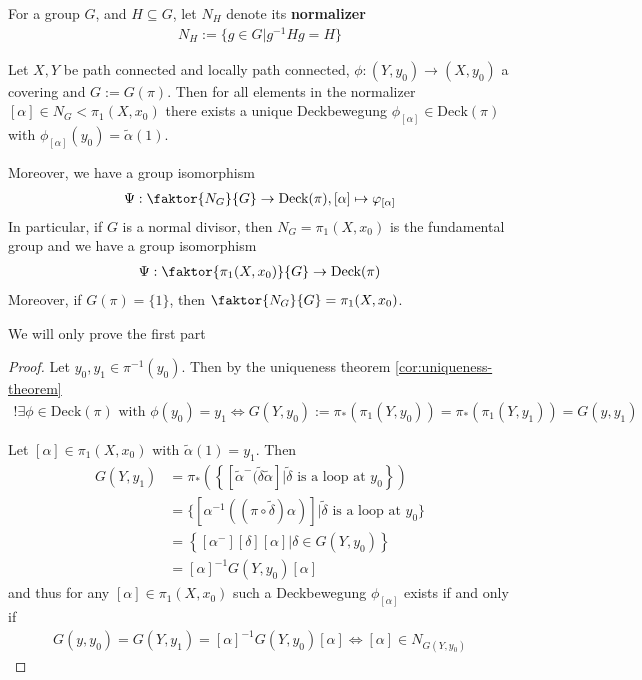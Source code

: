 For a group $G$, and $H \subseteq G$, let $N_H$ denote its \textbf{normalizer}
\begin{align*}
  N_H := \{g \in G \big\vert g^{-1}Hg = H\}
\end{align*}
\begin{thm}
  Let $X,Y$ be path connected and locally path connected, $\phi:(Y,y_0) \to (X,y_0)$ a covering and $G := G(\pi)$.
  Then for all elements in the normalizer $[\alpha] \in N_G < \pi_1(X,x_0)$ there exists a unique Deckbewegung $\phi_{[\alpha]} \in \text{Deck}(\pi)$ with $\phi_{[\alpha]}(y_0) = \tilde{\alpha}(1)$.

  Moreover, we have a group isomorphism
  \begin{align*}
    \Psi: \faktor{N_G}{G} \to  \text{Deck}(\pi), [\alpha] \mapsto  \phi_{[\alpha]} 
  \end{align*}
  In particular, if $G$ is a normal divisor, then $N_G = \pi_1(X,x_0)$ is the fundamental group and we have a group isomorphism
  \begin{align*}
    \Psi: \faktor{\pi_1(X,x_0)}{G} \to \text{Deck}(\pi)
  \end{align*}
  Moreover, if $G(\pi) = \{1\}$, then $\faktor{N_G}{G} = \pi_1(X,x_0)$.
\end{thm}
We will only prove the first part
\begin{proof}
  Let $y_0,y_1 \in \pi^{-1}(y_0)$. Then by the uniqueness theorem \ref{cor:uniqueness-theorem}
  \begin{align*}
    !\exists \phi \in \text{Deck}(\pi) \text{ with } \phi(y_0) = y_1 \iff G(Y,y_0) := \pi_{\ast}(\pi_1(Y,y_0))= \pi_{\ast}(\pi_1(Y,y_1)) = G(y,y_1)
  \end{align*}

  Let $[\alpha] \in \pi_1(X,x_0)$ with $\tilde{\alpha}(1) = y_1$. Then
  \begin{align*}
    G(Y,y_1) 
    &= \pi_{\ast}\left(
      \left\{
        [\tilde{\alpha}^{-} (\tilde{\delta} \tilde{\alpha}] \big\vert \tilde{\delta} \text{ is a loop at } y_0
      \right\}
    \right)\\
    &= \{\left[\alpha^{-1}\left(
        (\pi \circ \tilde{\delta}) \alpha
    \right)\right]
    \big\vert \tilde{\delta} \text{ is a loop at }y_0
  \}
  \\
    &=
    \left\{[\alpha^{-}][\delta][\alpha] \big\vert \delta \in G(Y,y_0)\right\}\\
    &=
    [\alpha]^{-1} G(Y,y_0)[\alpha]
  \end{align*}
  and thus for any $[\alpha] \in \pi_1(X,x_0)$ such a Deckbewegung $\phi_{[\alpha]}$ exists if and only if
  \begin{align*}
    G(y,y_0) = G(Y,y_1)  = [\alpha]^{-1} G(Y,y_0)[\alpha] \iff [\alpha] \in N_{G(Y,y_0)}
  \end{align*}
\end{proof}

